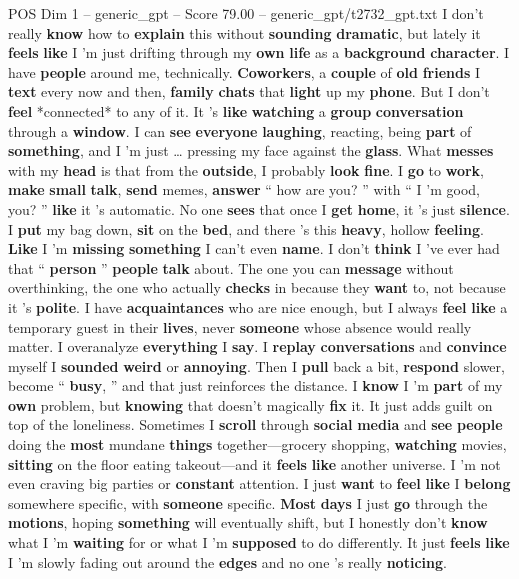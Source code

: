\begin{textsample}{POS Dim 1 – generic\_gpt – Score 79.00 – generic\_gpt/t2732\_gpt.txt}  \label{ex:f1_pos_020}
I don't really \textbf{know} how to \textbf{explain} this without \textbf{sounding} \textbf{dramatic}, but lately it \textbf{feels} \textbf{like} I ’m just drifting through my \textbf{own} \textbf{life} as a \textbf{background} \textbf{character}.
I have \textbf{people} around me, technically. \textbf{Coworkers}, a \textbf{couple} of \textbf{old} \textbf{friends} I \textbf{text} every now and then, \textbf{family} \textbf{chats} that \textbf{light} up my \textbf{phone}.
But I don't \textbf{feel} *connected* to any of it.
It ’s \textbf{like} \textbf{watching} a \textbf{group} \textbf{conversation} through a \textbf{window}.
I can \textbf{see} \textbf{everyone} \textbf{laughing}, reacting, being \textbf{part} of \textbf{something}, and I ’m just … pressing my face against the \textbf{glass}.
What \textbf{messes} with my \textbf{head} is that from the \textbf{outside}, I probably \textbf{look} \textbf{fine}.
I \textbf{go} to \textbf{work}, \textbf{make} \textbf{small} \textbf{talk}, \textbf{send} memes, \textbf{answer} “ how are you? ” with “ I ’m good, you? ” \textbf{like} it ’s automatic.
No one \textbf{sees} that once I \textbf{get} \textbf{home}, it ’s just \textbf{silence}.
I \textbf{put} my bag down, \textbf{sit} on the \textbf{bed}, and there ’s this \textbf{heavy}, hollow \textbf{feeling}. \textbf{Like} I ’m \textbf{missing} \textbf{something} I can't even \textbf{name}.
I don't \textbf{think} I ’ve ever had that “ \textbf{person} ” \textbf{people} \textbf{talk} about.
The one you can \textbf{message} without overthinking, the one who actually \textbf{checks} in because they \textbf{want} to, not because it ’s \textbf{polite}.
I have \textbf{acquaintances} who are nice enough, but I always \textbf{feel} \textbf{like} a temporary guest in their \textbf{lives}, never \textbf{someone} whose absence would really matter.
I overanalyze \textbf{everything} I \textbf{say}.
I \textbf{replay} \textbf{conversations} and \textbf{convince} myself I \textbf{sounded} \textbf{weird} or \textbf{annoying}.
Then I \textbf{pull} back a bit, \textbf{respond} slower, become “ \textbf{busy}, ” and that just reinforces the distance.
I \textbf{know} I ’m \textbf{part} of my \textbf{own} problem, but \textbf{knowing} that doesn't magically \textbf{fix} it.
It just adds guilt on top of the loneliness.
Sometimes I \textbf{scroll} through \textbf{social} \textbf{media} and \textbf{see} \textbf{people} doing the \textbf{most} mundane \textbf{things} together—grocery shopping, \textbf{watching} movies, \textbf{sitting} on the floor eating takeout—and it \textbf{feels} \textbf{like} another universe.
I ’m not even craving big parties or \textbf{constant} attention.
I just \textbf{want} to \textbf{feel} \textbf{like} I \textbf{belong} somewhere specific, with \textbf{someone} specific. \textbf{Most} \textbf{days} I just \textbf{go} through the \textbf{motions}, hoping \textbf{something} will eventually shift, but I honestly don't \textbf{know} what I ’m \textbf{waiting} for or what I ’m \textbf{supposed} to do differently.
It just \textbf{feels} \textbf{like} I ’m slowly fading out around the \textbf{edges} and no one ’s really \textbf{noticing}.


\end{textsample}

